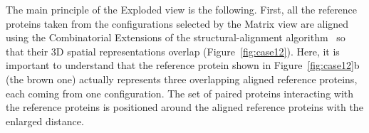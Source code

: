 \documentclass{bmcart}
\def\ExpView {Exploded view\xspace}
\def\MatView {Matrix view\xspace}
\begin{document}


The main principle of the \ExpView is the following.
First, all the reference proteins taken from the configurations selected by the \MatView are aligned using the Combinatorial Extensions of the structural-alignment algorithm~\cite{Shindyalov1998} so that their 3D spatial representations overlap (Figure~\ref{fig:case12}). 
Here, it is important to understand that the reference protein shown in Figure~\ref{fig:case12}b (the brown one) actually represents three overlapping aligned reference proteins, each coming from one configuration.
The set of paired proteins interacting with the reference proteins is positioned around the aligned reference proteins with the enlarged distance.

\end{document}
